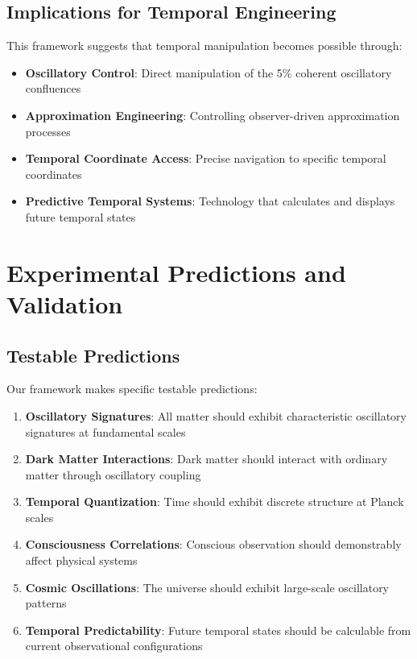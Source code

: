 \documentclass[11pt]{article}
\theoremstyle{remark}
\begin{document}
\subsection{Implications for Temporal Engineering}

This framework suggests that temporal manipulation becomes possible through:

\begin{itemize}
\item \textbf{Oscillatory Control}: Direct manipulation of the 5\% coherent oscillatory confluences
\item \textbf{Approximation Engineering}: Controlling observer-driven approximation processes
\item \textbf{Temporal Coordinate Access}: Precise navigation to specific temporal coordinates
\item \textbf{Predictive Temporal Systems}: Technology that calculates and displays future temporal states
\end{itemize}

\section{Experimental Predictions and Validation}

\subsection{Testable Predictions}

Our framework makes specific testable predictions:

\begin{enumerate}
\item \textbf{Oscillatory Signatures}: All matter should exhibit characteristic oscillatory signatures at fundamental scales
\item \textbf{Dark Matter Interactions}: Dark matter should interact with ordinary matter through oscillatory coupling
\item \textbf{Temporal Quantization}: Time should exhibit discrete structure at Planck scales
\item \textbf{Consciousness Correlations}: Conscious observation should demonstrably affect physical systems
\item \textbf{Cosmic Oscillations}: The universe should exhibit large-scale oscillatory patterns
\item \textbf{Temporal Predictability}: Future temporal states should be calculable from current observational configurations
\end{enumerate}
\end{document}
